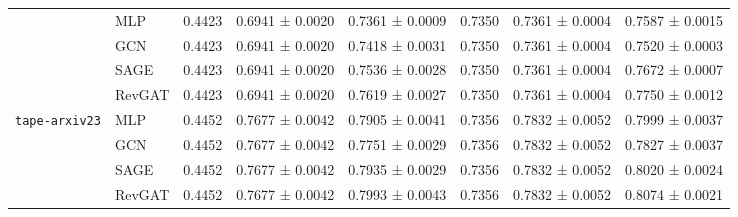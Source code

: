 \documentclass{article}
\begin{document}
\begin{table}[!ht]
\begin{tabular}{llcccccc}
    & MLP
         & {0.4423}
         & {0.6941 ± 0.0020}
         & 0.7361 ± 0.0009
         & 0.7350
         & 0.7361 ± 0.0004
         & 0.7587 ± 0.0015
         \\
         & GCN 
         & {0.4423}
         & {0.6941 ± 0.0020}
         & {0.7418 ± 0.0031}
         & 0.7350
         & 0.7361 ± 0.0004
         & 0.7520 ± 0.0003
         \\
         & SAGE
         & {0.4423}
         & {0.6941 ± 0.0020}
         & {0.7536 ± 0.0028}
         & 0.7350
         & 0.7361 ± 0.0004
         & 0.7672 ± 0.0007
         \\
         & RevGAT
         & {0.4423}
         & {0.6941 ± 0.0020}
         & {0.7619 ± 0.0027}
         & 0.7350
         & 0.7361 ± 0.0004
         & {0.7750 ± 0.0012}
         \\
         \midrule
         \multirow{3}{*}{\texttt{tape-arxiv23}}
         & MLP
         & 0.4452
         & 0.7677 ± 0.0042
         & 0.7905 ± 0.0041
         & 0.7356
         & 0.7832 ± 0.0052
         & 0.7999 ± 0.0037
         \\
         & GCN
         & 0.4452
         & 0.7677 ± 0.0042
         & 0.7751 ± 0.0029
         & 0.7356
         & 0.7832 ± 0.0052
         & 0.7827 ± 0.0037
         \\
         & SAGE
         & 0.4452
         & 0.7677 ± 0.0042
         & 0.7935 ± 0.0029
         & 0.7356
         & 0.7832 ± 0.0052
         & 0.8020 ± 0.0024
         \\
         & RevGAT
         & 0.4452
         & 0.7677 ± 0.0042
         & 0.7993 ± 0.0043
         & 0.7356
         & 0.7832 ± 0.0052
         & 0.8074 ± 0.0021
         \\
    \bottomrule
    \end{tabular}
\end{table}
\end{document}
